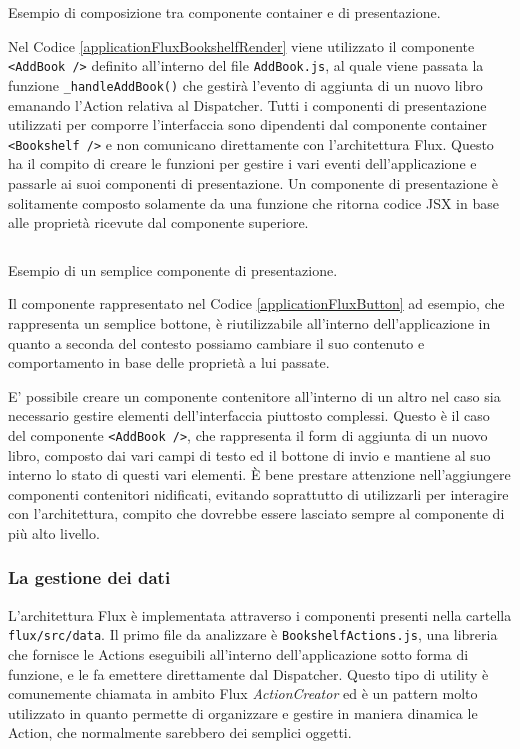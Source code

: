\begin{listing}[ht]
\inputminted{jsx}{sources/applicationFluxBookshelfRender.js}
\caption{Esempio di composizione tra componente container e di presentazione.} 
\label{applicationFluxBookshelfRender} 
\end{listing} 

Nel Codice \ref{applicationFluxBookshelfRender} viene utilizzato il componente \texttt{<AddBook />} definito all'interno del file \texttt{AddBook.js}, al quale viene passata la funzione \texttt{_handleAddBook()} che gestirà l'evento di aggiunta di un nuovo libro emanando l'Action relativa al Dispatcher. Tutti i componenti di presentazione utilizzati per comporre l'interfaccia sono dipendenti dal componente container \texttt{<Bookshelf />} e non comunicano direttamente con l'architettura Flux. Questo ha il compito di creare le funzioni per gestire i vari eventi dell'applicazione e passarle ai suoi componenti di presentazione. Un componente di presentazione è solitamente composto solamente da una funzione che ritorna codice JSX in base alle proprietà ricevute dal componente superiore.

\begin{listing}[ht]
\inputminted{jsx}{sources/applicationFluxButton.js}
\caption{Esempio di un semplice componente di presentazione.} 
\label{applicationFluxButton} 
\end{listing} 

Il componente rappresentato nel Codice \ref{applicationFluxButton} ad esempio, che rappresenta un semplice bottone, è riutilizzabile all'interno dell'applicazione in quanto a seconda del contesto possiamo cambiare il suo contenuto e comportamento in base delle proprietà a lui passate.

E' possibile creare un componente contenitore all'interno di un altro nel caso sia necessario gestire elementi dell'interfaccia piuttosto complessi. Questo è il caso del componente \texttt{<AddBook />}, che rappresenta il form di aggiunta di un nuovo libro, composto dai vari campi di testo ed il bottone di invio e mantiene al suo interno lo stato di questi vari elementi. È bene prestare attenzione nell'aggiungere componenti contenitori nidificati, evitando soprattutto di utilizzarli per interagire con l'architettura, compito che dovrebbe essere lasciato sempre al componente di più alto livello.

\subsubsection*{La gestione dei dati}
L'architettura Flux è implementata attraverso i componenti presenti nella cartella \texttt{flux/src/data}. Il primo file da analizzare è \texttt{BookshelfActions.js}, una libreria che fornisce le Actions eseguibili all'interno dell'applicazione sotto forma di funzione, e le fa emettere direttamente dal Dispatcher. Questo tipo di utility è comunemente chiamata in ambito Flux \textit{ActionCreator} ed è un pattern molto utilizzato in quanto permette di organizzare e gestire in maniera dinamica le Action, che normalmente sarebbero dei semplici oggetti.

